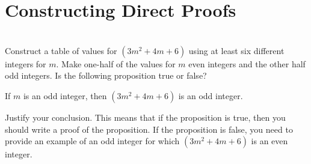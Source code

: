 \section{Constructing Direct Proofs} \label{S:direct}
\setcounter{previewactivity}{0}
%





%














\begin{prog}\label{A:kstable2} \hfill \\
Construct a table of values for  $\left( {3m^2  + 4m + 6} \right)$
 using at least six different integers for  $m$.  Make one-half of the values for  $m$  even integers and the other half odd integers.  Is the following proposition true or false?  

\begin{center}
If $m$ is an odd integer, then $\left(3m^2 + 4m + 6 \right)$ is an odd integer.
\end{center}
Justify your conclusion.  This means that if the proposition is true, then you should write a proof of the proposition.  If the proposition is false, you need to provide an example of an odd integer for which $\left(3m^2 + 4m + 6 \right)$ is an even integer.
\end{prog}
\hbreak


